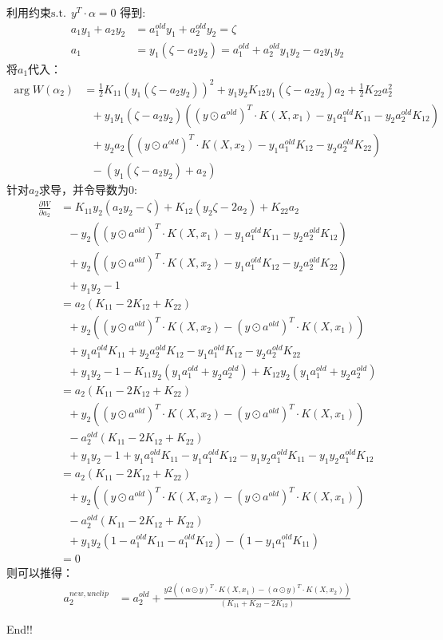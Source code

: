 \documentclass[12pt, a4paper, oneside]{ctexart}
\begin{document}
利用约束$ \mathrm{ s.t. } \ \ y^T \cdot \alpha = 0 $ 得到: 
\begin{align}      
     a_1y_1 + a_2y_2 &= a_1^{old}y_1 + a_2^{old}y_2 = \zeta \nonumber\\
     a_1 &= y_1( \zeta - a_2y_2) =  a_1^{old} + a_2^{old}y_1y_2 - a_2y_1y_2 \nonumber
\end{align}
将$a_1$代入：
\begin{align}      
    \mathop{\arg\min_{\alpha_2}}  W(\alpha_2) &=  \frac{1}{2}K_{11}(y_1( \zeta - a_2y_2))^2 + y_1y_2K_{12}y_1( \zeta - a_2y_2)a_2  + \frac{1}{2}K_{22}a_2^2 \nonumber \\
        & \ \ \ + y_1y_1( \zeta - a_2y_2)((y \odot a^{old})^T \cdot K(X, x_1) - y_1a_1^{old}K_{11} - y_2a_2^{old}K_{12} ) \nonumber \\
        & \ \ \ + y_2a_2((y \odot a^{old})^T \cdot K(X, x_2) - y_1a_1^{old}K_{12} - y_2a_2^{old}K_{22} ) \nonumber \\
        & \ \ \ - (y_1( \zeta - a_2y_2) + a_2) \nonumber 
\end{align}
针对$a_2$求导，并令导数为0:
\begin{align}
    \frac{\partial W}{\partial a_2} &= K_{11}y_2( a_2y_2 - \zeta) + K_{12}(y_2\zeta - 2a_2) + K_{22}a_2 \nonumber \\
    & \ \ \ - y_2((y \odot a^{old})^T \cdot K(X, x_1) - y_1a_1^{old}K_{11} - y_2a_2^{old}K_{12} ) \nonumber \\
    & \ \ \ + y_2((y \odot a^{old})^T \cdot K(X, x_2) - y_1a_1^{old}K_{12} - y_2a_2^{old}K_{22} ) \nonumber \\
    & \ \ \ + y_1y_2 - 1 \nonumber \\
    &= a_2(K_{11} - 2K_{12} + K_{22}) \nonumber \\
    & \ \ \ + y_2((y \odot a^{old})^T \cdot K(X, x_2) - (y \odot a^{old})^T \cdot K(X, x_1) ) \nonumber \\
    & \ \ \ + y_1a_1^{old}K_{11} + y_2a_2^{old}K_{12} - y_1a_1^{old}K_{12} - y_2a_2^{old}K_{22} \nonumber \\
    & \ \ \ + y_1y_2 - 1 - K_{11}y_2(y_1a_1^{old} + y_2a_2^{old}) + K_{12}y_2(y_1a_1^{old} + y_2a_2^{old}) \nonumber \\
    &= a_2(K_{11} - 2K_{12} + K_{22}) \nonumber \\
    & \ \ \ + y_2((y \odot a^{old})^T \cdot K(X, x_2) - (y \odot a^{old})^T \cdot K(X, x_1) ) \nonumber \\
    & \ \ \ - a_2^{old}(K_{11} - 2K_{12} + K_{22}) \nonumber \\
    & \ \ \ + y_1y_2 - 1 + y_1a_1^{old}K_{11}  - y_1a_1^{old}K_{12} - y_1y_2a_1^{old}K_{11}- y_1y_2a_1^{old}K_{12} \nonumber \\
    &= a_2(K_{11} - 2K_{12} + K_{22})  \nonumber \\
    & \ \ \ + y_2((y \odot a^{old})^T \cdot K(X, x_2) - (y \odot a^{old})^T \cdot K(X, x_1) ) \nonumber \\
    & \ \ \ - a_2^{old}(K_{11} - 2K_{12} + K_{22}) \nonumber \\
    & \ \ \ + y_1y_2(1 - a_1^{old}K_{11} - a_1^{old}K_{12}) - (1 - y_1a_1^{old}K_{11})\nonumber \\
    &= 0 \nonumber
\end{align}
则可以推得：
\begin{align}      
    a_2^{new,unclip} &= a_2^{old} + \frac{y2((\alpha \odot y)^T \cdot K(X, x_1) - (\alpha \odot y)^T \cdot K(X, x_2))}{(K_{11} + K_{22} - 2K_{12})} \label{eq12} 
\end{align}

End!!
\end{document}
